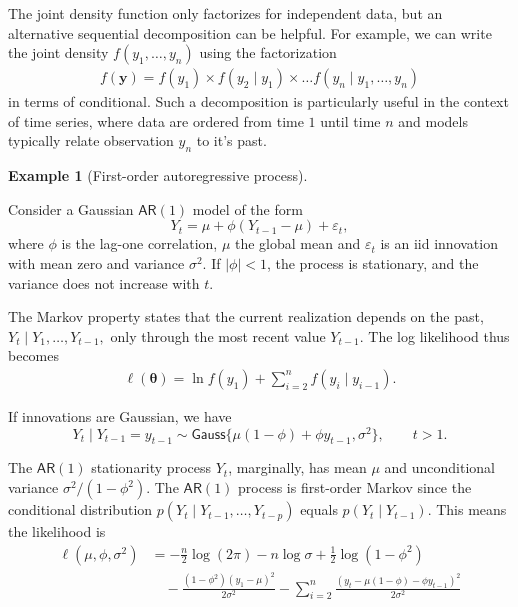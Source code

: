 \documentclass[
  11pt,
  letterpaper,
]{scrbook}
\theoremstyle{definition}
\theoremstyle{definition}
\newtheorem{example}{Example}[chapter]
\theoremstyle{definition}
\theoremstyle{plain}
\theoremstyle{plain}
\theoremstyle{remark}
\begin{document}
The joint density function only factorizes for independent data, but an
alternative sequential decomposition can be helpful. For example, we can
write the joint density \(f(y_1, \ldots, y_n)\) using the factorization
\begin{align*}
f(\boldsymbol{y}) = f(y_1) \times f(y_2 \mid y_1) \times \ldots f(y_n \mid y_1, \ldots, y_n)
\end{align*} in terms of conditional. Such a decomposition is
particularly useful in the context of time series, where data are
ordered from time \(1\) until time \(n\) and models typically relate
observation \(y_n\) to it's past.

\begin{example}[First-order autoregressive
process]\protect\hypertarget{exm-autoregressive-one}{}\label{exm-autoregressive-one}

Consider a Gaussian \(\mathsf{AR}(1)\) model of the form
\[Y_t = \mu + \phi(Y_{t-1} - \mu) + \varepsilon_t,\] where \(\phi\) is
the lag-one correlation, \(\mu\) the global mean and \(\varepsilon_t\)
is an iid innovation with mean zero and variance \(\sigma^2\). If
\(|\phi| < 1\), the process is stationary, and the variance does not
increase with \(t\).

The Markov property states that the current realization depends on the
past, \(Y_t \mid Y_1, \ldots, Y_{t-1},\) only through the most recent
value \(Y_{t-1}.\) The log likelihood thus becomes \begin{align*}
\ell(\boldsymbol{\theta}) = \ln f(y_1) + \sum_{i=2}^n f(y_i \mid y_{i-1}).
\end{align*}

If innovations are Gaussian, we have
\[Y_t \mid Y_{t-1}=y_{t-1} \sim \mathsf{Gauss}\{\mu(1-\phi)+ \phi y_{t-1}, \sigma^2\}, \qquad t>1.\]

The \(\mathsf{AR}(1)\) stationarity process \(Y_t\), marginally, has
mean \(\mu\) and unconditional variance \(\sigma^2/(1-\phi^2)\). The
\(\mathsf{AR}(1)\) process is first-order Markov since the conditional
distribution \(p(Y_t \mid Y_{t-1}, \ldots, Y_{t-p})\) equals
\(p(Y_t \mid Y_{t-1})\). This means the likelihood is \begin{align*}
\ell(\mu, \phi,\sigma^2)& = -\frac{n}{2}\log(2\pi) - n\log \sigma + \frac{1}{2}\log(1-\phi^2) \\&\quad -\frac{(1-\phi^2)(y_1- \mu)^2}{2\sigma^2} - \sum_{i=2}^n \frac{(y_t - \mu(1-\phi)- \phi y_{t-1})^2}{2\sigma^2}
\end{align*}

\end{example}
\end{document}
